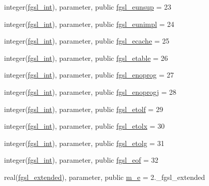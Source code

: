 \begin{DoxyCompactItemize}
\item 
integer(\hyperlink{namespacefgsl_a222deda1d7a0c0e845ce4a683318efeb}{fgsl\+\_\+int}), parameter, public \hyperlink{namespacefgsl_af76528fed48ac5623d664d6e66e7ac1b}{fgsl\+\_\+eunsup} = 23
\item 
integer(\hyperlink{namespacefgsl_a222deda1d7a0c0e845ce4a683318efeb}{fgsl\+\_\+int}), parameter, public \hyperlink{namespacefgsl_a3a2e9a31e7f3fc209b5269b82d17117c}{fgsl\+\_\+eunimpl} = 24
\item 
integer(\hyperlink{namespacefgsl_a222deda1d7a0c0e845ce4a683318efeb}{fgsl\+\_\+int}), parameter, public \hyperlink{namespacefgsl_aa9ace1ec026e9acd65806d63c8b6e649}{fgsl\+\_\+ecache} = 25
\item 
integer(\hyperlink{namespacefgsl_a222deda1d7a0c0e845ce4a683318efeb}{fgsl\+\_\+int}), parameter, public \hyperlink{namespacefgsl_ac1348341f3d95b02f852466ca383d1ae}{fgsl\+\_\+etable} = 26
\item 
integer(\hyperlink{namespacefgsl_a222deda1d7a0c0e845ce4a683318efeb}{fgsl\+\_\+int}), parameter, public \hyperlink{namespacefgsl_a11266b4068f90334758a26d35c116f73}{fgsl\+\_\+enoprog} = 27
\item 
integer(\hyperlink{namespacefgsl_a222deda1d7a0c0e845ce4a683318efeb}{fgsl\+\_\+int}), parameter, public \hyperlink{namespacefgsl_ad9567598ce07cacf43815d0453e649bb}{fgsl\+\_\+enoprogj} = 28
\item 
integer(\hyperlink{namespacefgsl_a222deda1d7a0c0e845ce4a683318efeb}{fgsl\+\_\+int}), parameter, public \hyperlink{namespacefgsl_a9b3ff0443a3c8e9570d06e762b1ca241}{fgsl\+\_\+etolf} = 29
\item 
integer(\hyperlink{namespacefgsl_a222deda1d7a0c0e845ce4a683318efeb}{fgsl\+\_\+int}), parameter, public \hyperlink{namespacefgsl_ad136d96d34c4ac68f155224650a94e4c}{fgsl\+\_\+etolx} = 30
\item 
integer(\hyperlink{namespacefgsl_a222deda1d7a0c0e845ce4a683318efeb}{fgsl\+\_\+int}), parameter, public \hyperlink{namespacefgsl_a12d84e3678cb637e43f1a7a888558110}{fgsl\+\_\+etolg} = 31
\item 
integer(\hyperlink{namespacefgsl_a222deda1d7a0c0e845ce4a683318efeb}{fgsl\+\_\+int}), parameter, public \hyperlink{namespacefgsl_a9641f79a70406a1c9f483f01fdb1ccfa}{fgsl\+\_\+eof} = 32
\item 
real(\hyperlink{namespacefgsl_a9f38abe97062020e8a507aaa5bc683ab}{fgsl\+\_\+extended}), parameter, public \hyperlink{namespacefgsl_abd883826f3a31d832e0746f37ac56cff}{m\+\_\+e} = 2.\+\_\+fgsl\+\_\+extended

\end{DoxyCompactItemize}
